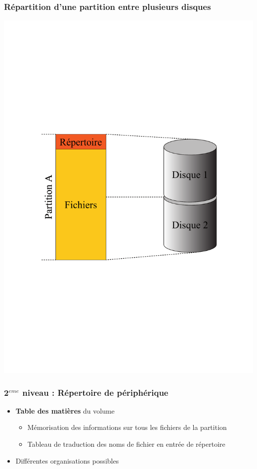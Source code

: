\begin{frame}
\frametitle{Répartition d'une partition entre plusieurs disques}
\includegraphics[height=.9\textheight]{../illustration/partition_1sur2.pdf}
\end{frame}


\begin{frame}
\frametitle{2$^{eme}$ niveau : Répertoire de périphérique}
\begin{itemize}
\item \textbf{Table des matières} du volume
\begin{itemize}
\item Mémorisation des informations sur tous les fichiers de la partition
\item Tableau de traduction des noms de fichier en entrée de répertoire
\end{itemize}
\item Différentes organisations possibles
\end{itemize}
\end{frame}

